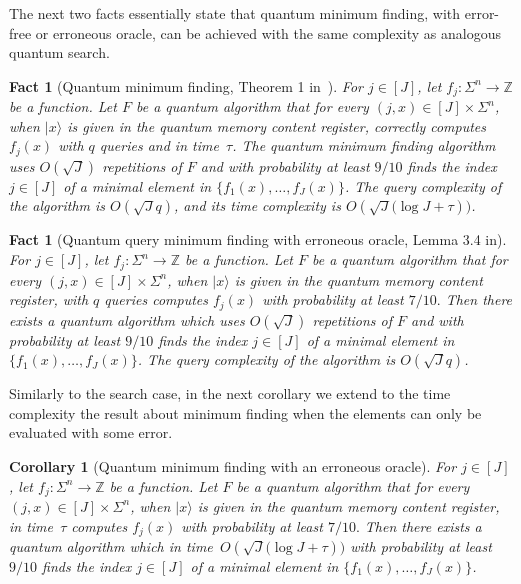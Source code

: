 \documentclass[12pt]{article}
\newcommand{\Z}{\mathbb{Z}}
\newcommand{\ket}[1]{|#1\rangle}
\newtheorem{corollary}[theorem]{Corollary}
\newtheorem{fact}[theorem]{Fact}
\theoremstyle{definition}
\begin{document}
The next two facts essentially state that quantum minimum finding, with error-free or erroneous oracle, can be achieved with the same complexity as analogous quantum search.
\begin{fact}[{\sc Quantum minimum finding}, Theorem 1 in~\cite{DH96}]
\label{fact:minimum}
For $j \in [J]$, let $f_j : \Sigma^n \rightarrow \Z$ be a function. Let $F$ be a quantum algorithm that for every $(j,x) \in [J] \times \Sigma^n$, when $\ket{x}$ is given in the quantum memory content register, correctly computes $f_j(x)$ with $q$ queries and in time~$\tau$.
The quantum minimum finding algorithm uses ${O}(\sqrt{J} )$ repetitions of $F$ and with probability at least $9/10$ finds the index $j \in [J]$ of a minimal element in $\{f_1(x), \ldots , f_J(x) \}$.
The query complexity of the algorithm is $O(\sqrt{J} q)$, and its time complexity is ${O}({\sqrt{J} ( \log J + \tau}))$.
\end{fact}

\begin{fact}[{\sc Quantum query minimum finding with erroneous oracle}, Lemma 3.4 in\cite{WY20}]
\label{fact:qmeo}
For $j \in [J]$, let $f_j : \Sigma^n \rightarrow \Z$ be a function. Let $F$ be a quantum algorithm that for every $(j,x) \in [J] \times \Sigma^n$, when $\ket{x}$ is given in the quantum memory content register, with $q$ queries computes $f_j(x)$ with probability at least $7/10.$
Then there exists a quantum algorithm which uses ${O}(\sqrt{J} )$ repetitions of $F$ and with probability at least $9/10$ finds the index $j \in [J]$ of a minimal element in $\{f_1(x), \ldots , f_J(x) \}$.
The query complexity of the algorithm is $O(\sqrt{J} q)$.
\end{fact}


Similarly to the search case, in the next corollary we extend to the time complexity the result about minimum finding when the elements can only be evaluated with some error. \\
\begin{corollary}[{\sc Quantum minimum finding with an erroneous oracle}]
\label{cor:meo}
For $j \in [J]$, let $f_j : \Sigma^n \rightarrow \Z$ be a function. Let $F$ be a quantum algorithm that for every $(j,x) \in [J] \times \Sigma^n$, when $\ket{x}$ is given in the quantum memory content register, in time~$\tau$ computes $f_j(x)$ with probability at least $7/10.$
Then there exists a quantum algorithm which in time~$O({\sqrt{J} ( \log J + \tau}))$ with probability at least $9/10$ finds the index $j \in [J]$ of a minimal element in $\{f_1(x), \ldots , f_J(x) \}$.
\end{corollary}
\end{document}
